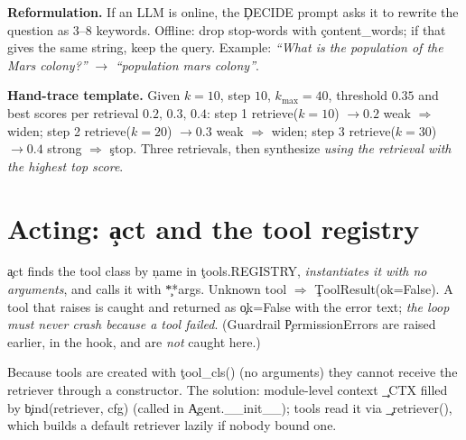\textbf{Reformulation.} If an LLM is online, the \c{DECIDE} prompt asks it to rewrite the question as 3--8 keywords. Offline: drop stop-words with \c{content\_words}; if that gives the same string, keep the query. Example: \emph{``What is the population of the Mars colony?''} $\to$ \emph{``population mars colony''}.
\begin{tip}
\textbf{Hand-trace template.} Given $k=10$, step $10$, $k_{\max}=40$, threshold $0.35$ and best scores per retrieval $0.2,\,0.3,\,0.4$: step 1 retrieve($k{=}10$) $\to0.2$ weak $\Rightarrow$ widen; step 2 retrieve($k{=}20$) $\to0.3$ weak $\Rightarrow$ widen; step 3 retrieve($k{=}30$) $\to0.4$ strong $\Rightarrow$ \c{stop}. Three retrievals, then synthesize \emph{using the retrieval with the highest top score}.
\end{tip}

\section{Acting: \c{act} and the tool registry}
\c{act} finds the tool class by \c{name} in \c{tools.REGISTRY}, \emph{instantiates it with no arguments}, and calls it with \c{**args}. Unknown tool $\Rightarrow$ \c{ToolResult(ok=False)}. A tool that raises is caught and returned as \c{ok=False} with the error text; \emph{the loop must never crash because a tool failed}. (Guardrail \c{PermissionError}s are raised earlier, in the hook, and are \emph{not} caught here.)

Because tools are created with \c{tool\_cls()} (no arguments) they cannot receive the retriever through a constructor. The solution: module-level context \c{\_CTX} filled by \c{bind(retriever, cfg)} (called in \c{Agent.\_\_init\_\_}); tools read it via \c{\_retriever()}, which builds a default retriever lazily if nobody bound one.

